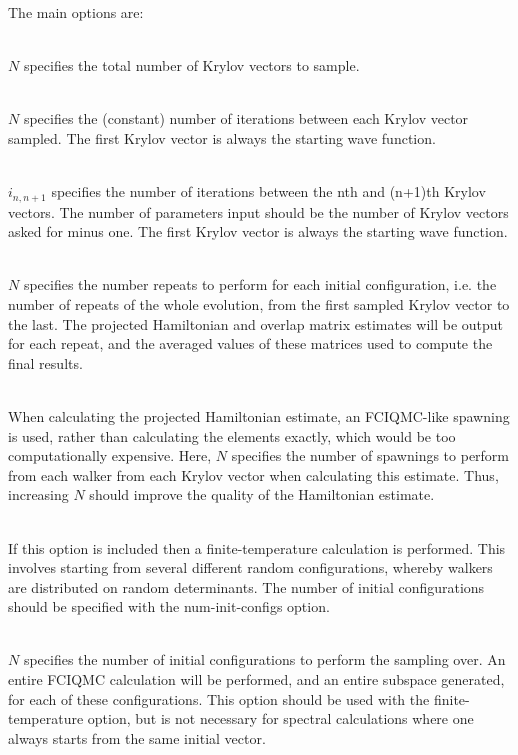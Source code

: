 \documentclass[a4paper,notitlepage]{scrreprt}
\newcommand\codeitem[1]{\needspace{1.5\baselineskip}\item[\textnormal{\ttfamily #1 \nopagebreak}] \hfill \\ \nopagebreak}
\begin{document}
    The main options are:
    \begin{description}
        \codeitem{num-krylov-vecs $N$}
            $N$ specifies the total number of Krylov vectors to sample.
        \codeitem{num-iters-between-vecs $N$}
            $N$ specifies the (constant) number of iterations between each Krylov
            vector sampled. The first Krylov vector is always the starting wave
            function.
        \codeitem{num-iters-between-vecs-vary $i_{12}$, $i_{23}$, $i_{34}$...}
            $i_{n,n+1}$ specifies the number of iterations between the nth and
            (n+1)th Krylov vectors. The number of parameters input should be
            the number of Krylov vectors asked for minus one. The first Krylov
            vector is always the starting wave function.
        \codeitem{num-repeats-per-init-config $N$}
            $N$ specifies the number repeats to perform for each initial
            configuration, i.e. the number of repeats of the whole evolution,
            from the first sampled Krylov vector to the last. The projected
            Hamiltonian and overlap matrix estimates will be output for each
            repeat, and the averaged values of these matrices used to compute
            the final results.
        \codeitem{averagemcexcits-hamil $N$}
            When calculating the projected Hamiltonian estimate, an FCIQMC-like
            spawning is used, rather than calculating the elements exactly,
            which would be too computationally expensive. Here, $N$ specifies the
            number of spawnings to perform from each walker from each Krylov
            vector when calculating this estimate. Thus, increasing $N$ should
            improve the quality of the Hamiltonian estimate.
        \codeitem{finite-temperature}
            If this option is included then a finite-temperature calculation is
            performed. This involves starting from several different random
            configurations, whereby walkers are distributed on random
            determinants. The number of initial configurations should be
            specified with the num-init-configs option.
        \codeitem{num-init-configs $N$}
            $N$ specifies the number of initial configurations to perform the
            sampling over. An entire FCIQMC calculation will be performed, and
            an entire subspace generated, for each of these configurations.
            This option should be used with the finite-temperature option, but
            is not necessary for spectral calculations where one always starts
            from the same initial vector.

\end{description}
\end{document}
